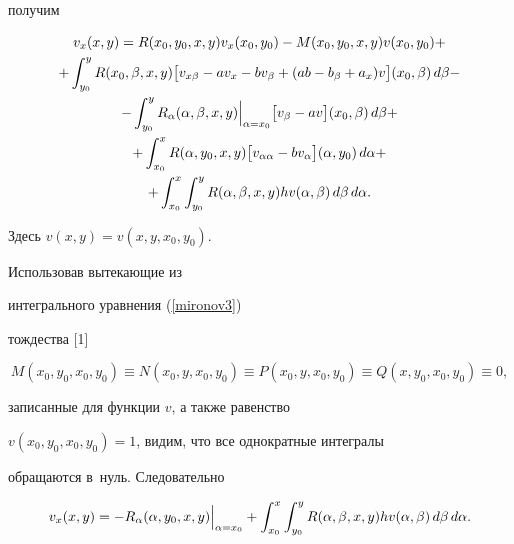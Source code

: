 получим


\begin{multline*}


v_{x}(x,y)=R(x_{0},  y_{0},  x, y)v_{x}(x_{0},  y_{0})


-M(x_{0},  y_{0},  x, y)v(x_{0},  y_{0})+\\


+\int_{y_{0}}^{y} R(x_{0},  \beta, x, y)


\bigl[v_{x\beta}-av_{x}-bv_{\beta}+(ab-b_{\beta}+a_{x})v\bigr](x_{0},  \beta)\,d\beta-\\


-\int_{y_{0}}^{y} R_{\alpha}(\alpha, \beta, x, y)\Bigl\vert_{\alpha=x_{0}}\Bigr. \bigl[v_{\beta}-av\bigr](x_{0},  \beta)\,d\beta +\\


+\int_{x_{0}}^{x} R(\alpha, y_{0},  x, y)\bigl[v_{\alpha\alpha}-bv_{\alpha}\bigr](\alpha, y_{0})\,d\alpha+\\


+\int_{x_{0}}^{x}\int_{y_{0}}^{y} R(\alpha, \beta, x, y)hv(\alpha, \beta)\,d\beta \,d\alpha.


\end{multline*}


Здесь $v(x,y)=v(x,y,x_{0}, y_{0})$.


Использовав вытекающие из


интегрального уравнения (\ref{mironov3})


тождества [1]


\begin{equation}\label{mironov9}


M(x_{0},  y_{0},  x_{0},  y_{0})\equiv N(x_{0},  y, x_{0},  y_{0})


\equiv P(x_{0},  y, x_{0},  y_{0})\equiv Q(x, y_{0},  x_{0},  y_{0})\equiv 0,


\end{equation}


записанные для функции $v$, а также равенство


$v(x_{0}, y_{0}, x_{0}, y_{0})=1$, видим, что все однократные интегралы


обращаются в~нуль. Следовательно





\begin{equation}\label{mironov10}


v_{x}(x,y)=-R_{\alpha}(\alpha,y_{0}, x,y)\Bigl\vert_{\alpha=x_{0}}\Bigr.


+\int_{x_{0}}^{x}\int_{y_{0}}^{y} R(\alpha,\beta,x,y)


hv(\alpha,\beta)\,d\beta \,d\alpha.


\end{equation}





